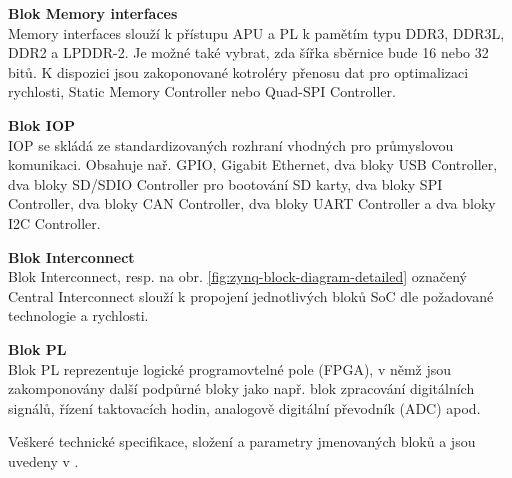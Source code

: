 \documentclass[a4paper, twoside, 11pt]{article}
\begin{document}
			\noindent\textbf{Blok Memory interfaces}\\
			Memory interfaces slouží k přístupu APU a PL k pamětím typu DDR3, DDR3L, DDR2 a LPDDR-2. Je možné také vybrat, zda šířka sběrnice bude 16 nebo 32 bitů. K dispozici jsou zakoponované kotroléry přenosu dat pro optimalizaci rychlosti, Static Memory Controller nebo Quad-SPI Controller.\par\vspace*{0.25cm}
			\noindent\textbf{Blok IOP}\\
			IOP se skládá ze standardizovaných rozhraní vhodných pro průmyslovou komunikaci. Obsahuje nař. GPIO, Gigabit Ethernet, dva bloky USB Controller, dva bloky SD/SDIO Controller pro bootování SD karty, dva bloky SPI Controller, dva bloky CAN Controller, dva bloky UART Controller a dva bloky I2C Controller.\par\vspace*{0.25cm}
			\noindent\textbf{Blok Interconnect}\\
			Blok Interconnect, resp. na obr. \ref{fig:zynq-block-diagram-detailed} označený Central Interconnect slouží k propojení jednotlivých bloků SoC dle požadované technologie a rychlosti.\par\vspace*{0.25cm}
			\noindent\textbf{Blok PL}\\
			Blok PL reprezentuje logické programovtelné pole (FPGA), v němž jsou zakomponovány další podpůrné bloky jako např. blok zpracování digitálních signálů, řízení taktovacích hodin, analogově digitální převodník (ADC) apod.\par\vspace*{0.35cm}
			\noindent Veškeré technické specifikace, složení a parametry jmenovaných bloků a jsou uvedeny v \cite{xilinx-zynq-7000-technical-reference-manual}.
\end{document}
